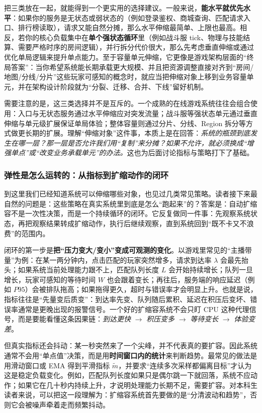 把三类放在一起，就能得到一个更实用的选择建议。一般来说，\textbf{能水平就优先水平}：如果你的服务是无状态或弱状态的（例如登录鉴权、商城查询、匹配请求入口、排行榜读取），请求又能自然分摊，那么水平伸缩最简单、上限也最高。相反，若你的核心负载集中在\textbf{单个强状态循环}里（例如战斗服 tick、物理与技能结算、需要严格时序的房间逻辑），并行拆分代价很大，那么先考虑垂直伸缩或通过优化单局逻辑来提升单点能力。至于容量单元伸缩，它更像是游戏架构层面的“终局答案”：当你希望系统能长期承载更大规模、并且把资源调整直接对齐到“房间/地图/分线/分片”这些玩家可感知的概念时，就应当把伸缩对象上移到业务容量单元，并在架构设计阶段就为“分裂、迁移、合并、下线”留好机制。

需要注意的是，这三类选择并不是互斥的。一个成熟的在线游戏系统往往会组合使用：入口与无状态服务通过水平伸缩应对突发流量；战斗服等强状态单元通过垂直伸缩与单元级扩展保证单局体验；整体容量则通过分片、分线、Region 拆分等方式做更长期的扩展。理解“伸缩对象”这件事，本质上是在回答：\emph{系统的瓶颈到底发生在哪一层？那一层是否允许我们用“复制”来分摊？如果不允许，就必须换成“增强单点”或“改变业务承载单元”的办法。}这也为后面讨论指标与策略打下了基础。

\subsubsection{弹性是怎么运转的：从指标到扩缩动作的闭环}
到这里我们已经知道系统可以伸缩哪些对象，也见过几类常见策略。读者接下来最自然的问题是：这些策略在真实系统里到底是怎么“跑起来”的？答案是：自动扩缩容不是一次性决策，而是一个持续循环的闭环。它反复做同一件事：先观察系统状态，再把观察结果转成扩缩动作，执行后继续观察，直到系统回到“既不卡又不浪费”的范围内。

闭环的第一步是\textbf{把“压力变大/变小”变成可观测的变化}。以游戏里常见的“主播带量”为例：在某一两分钟内，点击匹配的玩家突然增多，请求到达率 $\lambda$ 会最先抬头；如果系统当前处理能力跟不上，匹配队列长度 $L$ 会开始持续增长；队列一旦增长，玩家可感知的等待时间 $W$ 也会跟着变长；再往后，服务端的响应延迟（例如 $P95$）会被排队拖高；如果拖得更久，超时与错误率才会明显上升。也就是说，指标往往是“先量变后质变”：到达率先变、队列随后累积、延迟在积压后变坏、错误率通常是更晚出现的报警信号。一个好的扩缩容系统不会只盯 CPU 这种代理信号，而是要能看懂这条因果链：\emph{到达更快} $\rightarrow$ \emph{积压变多} $\rightarrow$ \emph{等待变长} $\rightarrow$ \emph{体验变差}。

但真实指标还会抖动：某一秒突然来了一个尖峰，并不代表真的要扩容。因此系统通常不会用“单点值”决策，而是用\textbf{时间窗口内的统计}来判断趋势。最常见的做法是用滑动窗口或 EMA 得到平滑指标 $\tilde{m}$，并要求“连续多次采样都偏离目标”才认为这是稳定负载变化。例如，匹配队列长度如果只是偶尔跳一下就回落，系统不应动作；如果它在几十秒内持续上升，才说明处理能力长期不足，需要扩容。对本科生读者来说，可以把这一段理解为：扩缩容系统首先要做的是“分清波动和趋势”，否则它会被噪声牵着走而频繁抖动。

